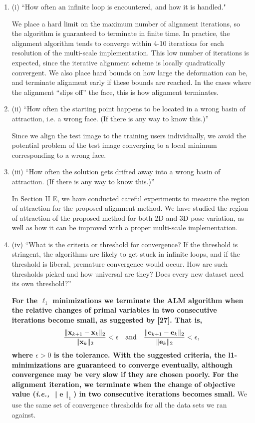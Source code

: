 \documentclass[11pt]{article}
\newcommand{\ie}{{\it i.e., }}
\newcommand{\e}{\mathbf{e}}
\newcommand{\x}{\mathbf{x}}
\begin{document}
\begin{enumerate}
\item (i) ``How often an infinite loop is encountered, and how it is handled."

We place a hard limit on the maximum number of alignment iterations, so the
algorithm is guaranteed to terminate in finite time.  In practice, the
alignment algorithm tends to converge within 4-10 iterations for each
resolution of the multi-scale implementation. This low number of iterations is expected, since the iterative alignment scheme is locally quadratically convergent. We also place hard bounds on how
large the deformation can be, and terminate alignment early if these bounds are
reached.  In the cases where the alignment ``slips off'' the face, this is how
alignment terminates.

\item (ii) ``How often the starting point happens to be located in a wrong basin of
attraction, i.e. a wrong face. (If there is any way to know this.)''

Since we align the test image to the training users individually, we avoid the
potential problem of the test image converging to a local minimum corresponding
to a wrong face.

\item (iii) ``How often the solution gets drifted away into a wrong basin of
attraction. (If there is any way to know this.)''

In Section II E, we have conducted careful experiments to measure the region of attraction
for the proposed alignment method. We have studied the region of attraction of the proposed
method for both 2D and 3D pose variation, as well as how it can be improved with a proper
multi-scale implementation.

\item (iv) ``What is the criteria or threshold for convergence? If the threshold is
stringent, the algorithms are likely to get stuck in infinite loops, and if the
threshold is liberal, premature convergence would occur. How are such
thresholds picked and how universal are they? Does every new dataset need its
own threshold?''

{\bf For the $\ell_1$ minimizations we terminate the ALM
algorithm when the relative changes of primal variables in
two consecutive iterations become small, as suggested by
[27]. That is,
\begin{displaymath}
\frac{\|\x_{k+1}-\x_k\|_2}{\|\x_k\|_2} < \epsilon \quad
\textup{and} \quad \frac{\|\e_{k+1}-\e_k\|_2}{\|\e_k\|_2} <
\epsilon,
\end{displaymath}
where $\epsilon>0$ is the tolerance. With the suggested
criteria, the l1-minimizations are guaranteed to converge
eventually, although convergence may be very slow if they
are chosen poorly. For the alignment
iteration, we terminate when the change of objective value
(\ie $\|\e\|_1$) in two consecutive iterations becomes
small.} We use the same set of convergence thresholds for
all the data sets we ran against. 


\end{enumerate}
\end{document}
